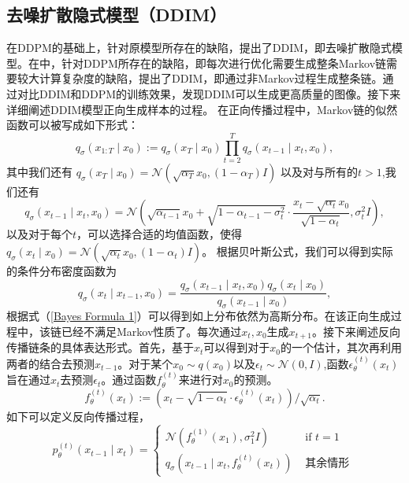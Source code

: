 \subsection{去噪扩散隐式模型（DDIM）}
在DDPM的基础上，针对原模型所存在的缺陷，提出了DDIM，即去噪扩散隐式模型。在\cite{DDIM}中，针对DDPM所存在的缺陷，即每次进行优化需要生成整条Markov链需要较大计算复杂度的缺陷，提出了DDIM，即通过非Markov过程生成整条链。通过对比DDIM和DDPM的训练效果，发现DDIM可以生成更高质量的图像。接下来详细阐述DDIM模型正向生成样本的过程。
在正向传播过程中，Markov链的似然函数可以被写成如下形式：
\begin{equation}
    q_\sigma\left({x}_{1: T} \mid {x}_0\right):=q_\sigma\left({x}_T \mid {x}_0\right) \prod_{t=2}^T q_\sigma\left({x}_{t-1} \mid {x}_t, {x}_0\right),
\end{equation}
其中我们还有 $q_\sigma\left({x}_T \mid {x}_0\right)=\mathcal{N}\left(\sqrt{\alpha_T} {x}_0,\left(1-\alpha_T\right) {I}\right)$ 以及对与所有的$t>1$,我们还有
\begin{equation}
    q_\sigma\left({x}_{t-1} \mid {x}_t, {x}_0\right)=\mathcal{N}\left(\sqrt{\alpha_{t-1}} {x}_0+\sqrt{1-\alpha_{t-1}-\sigma_t^2} \cdot \frac{{x}_t-\sqrt{\alpha_t} {x}_0}{\sqrt{1-\alpha_t}}, \sigma_t^2 {I}\right),
\end{equation}
以及对于每个$t$，可以选择合适的均值函数，使得$q_\sigma\left({x}_t \mid {x}_0\right)=\mathcal{N}\left(\sqrt{\alpha_t} {x}_0,\left(1-\alpha_t\right) {I}\right)$。
根据贝叶斯公式，我们可以得到实际的条件分布密度函数为
\begin{equation}
   q_\sigma\left({x}_t \mid {x}_{t-1}, {x}_0\right)=\frac{q_\sigma\left({x}_{t-1} \mid {x}_t, {x}_0\right) q_\sigma\left({x}_t \mid {x}_0\right)}{q_\sigma\left({x}_{t-1} \mid {x}_0\right)},
   \label{Bayes Formula 1}
\end{equation}
根据式（\ref{Bayes Formula 1}）可以得到如上分布依然为高斯分布。在该正向生成过程中，该链已经不满足Markov性质了。每次通过${x}_t,{x}_0$生成${x}_{t+1}$。接下来阐述反向传播链条的具体表达形式。首先，基于${x}_t$可以得到对于${x}_0$的一个估计，其次再利用两者的结合去预测${x}_{t-1}$。对于某个${x}_0\sim q({x}_0)$以及$\epsilon_t \sim \mathcal{N}(0,I)$,函数$\epsilon_{\theta}^{(t)}({x}_t)$旨在通过${x}_t$去预测$\epsilon_t$。通过函数$f^{(t)}_{\theta}$来进行对${x}_0$的预测。
\begin{equation}
f_\theta^{(t)}\left({x}_t\right):=\left({x}_t-\sqrt{1-\alpha_t} \cdot \epsilon_\theta^{(t)}\left({x}_t\right)\right) / \sqrt{\alpha_t}.
\end{equation}
如下可以定义反向传播过程，
\begin{equation}
 p_\theta^{(t)}\left({x}_{t-1} \mid {x}_t\right)= \begin{cases}\mathcal{N}\left(f_\theta^{(1)}\left({x}_1\right), \sigma_1^2 {I}\right) & \text { if } t=1 \\ q_\sigma\left({x}_{t-1} \mid {x}_t, f_\theta^{(t)}\left({x}_t\right)\right) & \text { 其余情形 }\end{cases}   
\end{equation}

